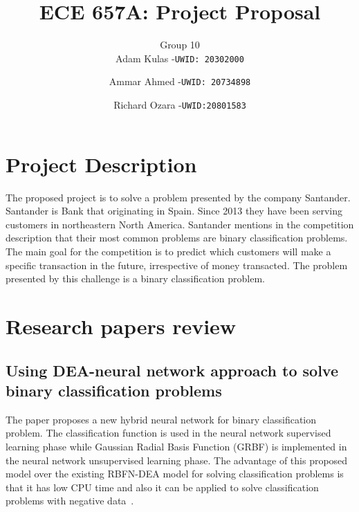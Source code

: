 \documentclass{llncs}
\begin{document}
%
\title{ECE 657A: Project Proposal}
%
%
\author{Group 10 \\ Adam Kulas -\texttt{UWID: 20302000}\and
Ammar Ahmed -\texttt{UWID: 20734898}\and
Richard Ozara -\texttt{UWID:20801583}}
%
%
%
\maketitle              %


\section{Project Description}

The proposed project is to solve a problem presented by the company Santander. Santander is Bank that originating in Spain. Since 2013 they have been serving customers in northeastern North America. Santander mentions in the competition description that their most common problems are binary classification problems. The main goal for the competition is to predict which customers will make a specific transaction in the future, irrespective of money transacted. The problem presented by this challenge is a binary classification problem.

\section{Research papers review}
\subsection{Using DEA-neural network approach to solve binary classification problems}
The paper proposes a new hybrid neural network for binary classification problem. The classification function is used in the neural network supervised learning phase while Gaussian Radial Basis Function (GRBF) is implemented in the neural network unsupervised learning phase. The advantage of this proposed model over the existing RBFN-DEA model for solving classification problems is that it has low CPU time and also it can be applied to solve classification problems with negative data~\cite{ref_article1}.
\end{document}
